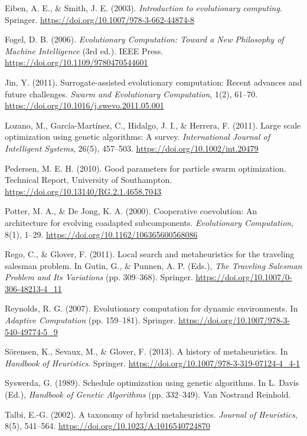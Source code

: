 \documentclass[10pt,a4paper]{article}
\begin{document}
\begin{thebibliography}{99}
Eiben, A. E., \& Smith, J. E. (2003). \textit{Introduction to evolutionary computing}. Springer. \url{https://doi.org/10.1007/978-3-662-44874-8}

Fogel, D. B. (2006). \textit{Evolutionary Computation: Toward a New Philosophy of Machine Intelligence} (3rd ed.). IEEE Press. \url{https://doi.org/10.1109/9780470544601}

Jin, Y. (2011). Surrogate-assisted evolutionary computation: Recent advances and future challenges. \textit{Swarm and Evolutionary Computation}, 1(2), 61–70. \url{https://doi.org/10.1016/j.swevo.2011.05.001}

Lozano, M., García-Martínez, C., Hidalgo, J. I., \& Herrera, F. (2011). Large scale optimization using genetic algorithms: A survey. \textit{International Journal of Intelligent Systems}, 26(5), 457–503. \url{https://doi.org/10.1002/int.20479}

Pedersen, M. E. H. (2010). Good parameters for particle swarm optimization. Technical Report, University of Southampton. \url{https://doi.org/10.13140/RG.2.1.4658.7043}

Potter, M. A., \& De Jong, K. A. (2000). Cooperative coevolution: An architecture for evolving coadapted subcomponents. \textit{Evolutionary Computation}, 8(1), 1–29. \url{https://doi.org/10.1162/106365600568086}

Rego, C., \& Glover, F. (2011). Local search and metaheuristics for the traveling salesman problem. In Gutin, G., \& Punnen, A. P. (Eds.), \textit{The Traveling Salesman Problem and Its Variations} (pp. 309–368). Springer. \url{https://doi.org/10.1007/0-306-48213-4_11}

Reynolds, R. G. (2007). Evolutionary computation for dynamic environments. In \textit{Adaptive Computation} (pp. 159–181). Springer. \url{https://doi.org/10.1007/978-3-540-49774-5_9}

Sörensen, K., Sevaux, M., \& Glover, F. (2013). A history of metaheuristics. In \textit{Handbook of Heuristics}. Springer. \url{https://doi.org/10.1007/978-3-319-07124-4_4-1}

Syswerda, G. (1989). Schedule optimization using genetic algorithms. In L. Davis (Ed.), \textit{Handbook of Genetic Algorithms} (pp. 332–349). Van Nostrand Reinhold.

Talbi, E.-G. (2002). A taxonomy of hybrid metaheuristics. \textit{Journal of Heuristics}, 8(5), 541–564. \url{https://doi.org/10.1023/A:1016540724870}


\end{thebibliography}
\end{document}
